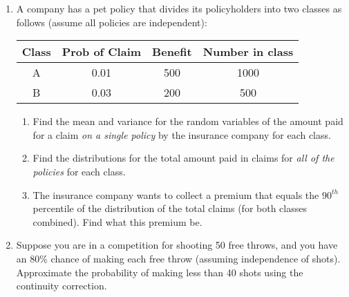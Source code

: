 \documentclass{article}
\begin{document}
\begin{enumerate}
    \item A company has a pet policy that divides its policyholders into two classes as follows (assume all policies are independent):\\%
    \begin{center}
    \begin{tabular}{c c c c}
        \hline
        Class & Prob of Claim & Benefit & Number in class\\
        \hline
        A & 0.01 & 500 & 1000\\
        \hline
        B & 0.03 & 200 & 500\\
        \hline
    \end{tabular}
    \end{center}\smallskip
    \begin{enumerate}
        \item Find the mean and variance for the random variables of the amount paid for a claim \textit{on a single policy} by the insurance company for each class.\vspace{140pt}%
        \item Find the distributions for the total amount paid in claims for \textit{all of the policies} for each class.\vspace{140pt}%
        \item The insurance company wants to collect a premium that equals the $90^{th}$ percentile of the distribution of the total claims (for both classes combined). Find what this premium be.\vspace{140pt}%
    \end{enumerate}
    
    \item Suppose you are in a competition for shooting 50 free throws, and you have an 80\% chance of making each free throw (assuming independence of shots). Approximate the probability of making less than 40 shots using the continuity correction.\vspace{100pt}%
        
\end{enumerate}
\end{document}
